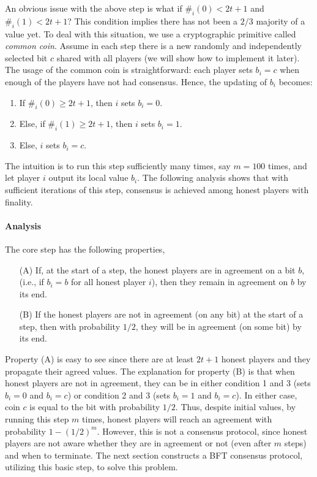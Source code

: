 \documentclass{article}
\begin{document}
An obvious issue with the above step is what if  $\#_i(0)< 2t+1$ and  $\#_i(1)< 2t+1$? This condition implies there has not been a $2/3$ majority of a value yet. To deal with this situation, we use a cryptographic primitive called \emph{common coin}. Assume in each step there is a new randomly and independently selected bit $c$ shared with all players (we will show how to implement it later). The usage of the common coin is straightforward: each player sets $b_i=c$ when enough of the players have not had consensus. Hence, the updating of $b_i$ becomes:
\begin{enumerate}
    \item If $\#_i(0)\ge 2t+1$, then $i$ sets $b_i=0$.
    \item Else, if $\#_i(1)\ge 2t+1$, then $i$ sets $b_i=1$.
    \item Else, $i$ sets $b_i=c$.
\end{enumerate}
The intuition is to run this step  sufficiently many times, say $m=100$ times, and let player $i$ output its local value $b_i$. The following analysis shows that with sufficient iterations of this step, consensus is achieved among honest players with finality. 

\paragraph{Analysis} The core step has the following properties,
\begin{itemize}
    \item[(A)] If, at the start of a step, the honest players are in agreement on a bit $b$, (i.e., if $b_i = b$ for all honest player $i$), then they remain in agreement on $b$ by its end.
    \item[(B)] If the honest players are not in agreement (on any bit) at the start of a step, then with probability $1/2$, they will be in agreement (on some bit) by its end.
\end{itemize}
Property (A) is easy to see since there are at least $2t+1$ honest players and they propagate their agreed values. The explanation for property (B) is that when honest players are not in agreement, they can be in either condition 1 and 3 (sets $b_i=0$ and $b_i=c$) or condition 2 and 3 (sets $b_i=1$ and $b_i=c$). In either case, coin $c$ is equal to the bit with probability $1/2$. Thus, despite initial values, by running this  step $m$ times, honest players will reach an agreement with probability $1-(1/2)^{m}$. However, this is not a consensus protocol, since honest players are not aware whether they are in agreement or not (even after $m$ steps) and when to terminate. The next section constructs a BFT consensus protocol, utilizing this basic step, to  solve this problem.
\end{document}
